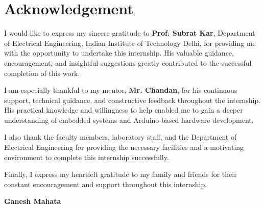 \chapter*{Acknowledgement}

I would like to express my sincere gratitude to \textbf{Prof. Subrat Kar}, Department of Electrical Engineering, Indian Institute of Technology Delhi, for providing me with the opportunity to undertake this internship. His valuable guidance, encouragement, and insightful suggestions greatly contributed to the successful completion of this work.

I am especially thankful to my mentor, \textbf{Mr. Chandan}, for his continuous support, technical guidance, and constructive feedback throughout the internship. His practical knowledge and willingness to help enabled me to gain a deeper understanding of embedded systems and Arduino-based hardware development.

I also thank the faculty members, laboratory staff, and the Department of Electrical Engineering for providing the necessary facilities and a motivating environment to complete this internship successfully.

Finally, I express my heartfelt gratitude to my family and friends for their constant encouragement and support throughout this internship.

\vspace{1.5cm}

\begin{flushright}
\textbf{Ganesh Mahata}
\end{flushright}

\clearpage